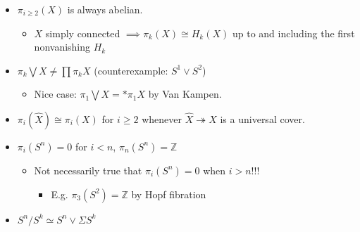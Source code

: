 \begin{itemize}
\item
  \(\pi_{i\geq 2}(X)\) is always abelian.

  \begin{itemize}
  \tightlist
  \item
    \(X\) simply connected \(\implies \pi_{k}(X) \cong H_{k}(X)\) up to
    and including the first nonvanishing \(H_{k}\)
  \end{itemize}
\item
  \(\pi_{k} \bigvee X \neq \prod \pi_{k} X\) (counterexample:
  \(S^1 \vee S^2\))

  \begin{itemize}
  \tightlist
  \item
    Nice case: \(\pi_{1}\bigvee X = \ast \pi_{1} X\) by Van Kampen.
  \end{itemize}
\item
  \(\pi_{i}(\widehat{X}) \cong \pi_{i}(X)\) for \(i\geq 2\) whenever
  \(\widehat{X} \twoheadrightarrow X\) is a universal cover.
\item
  \(\pi_{i}(S^n) = 0\) for \(i < n\), \(\pi_{n}(S^n) = {\mathbb{Z}}\)

  \begin{itemize}
  \tightlist
  \item
    Not necessarily true that \(\pi_{i}(S^n) = 0\) when \(i > n\)!!!

    \begin{itemize}
    \tightlist
    \item
      E.g. \(\pi_{3}(S^2) = {\mathbb{Z}}\) by Hopf fibration
    \end{itemize}
  \end{itemize}
\item
  \(S^n / S^k \simeq S^n \vee \Sigma S^{k}\)


\end{itemize}
